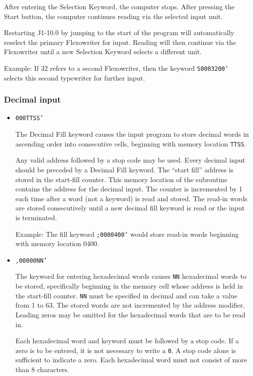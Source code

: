 \documentclass{article}
\begin{document}
\begin{enumerate}
\begin{itemize}
After entering the Selection Keyword, the computer stops. After pressing the Start button, the computer continues reading via the selected input unit. 

Restarting J1-10.0 by jumping to the start of the program will automatically reselect the primary Flexowriter for input. Reading will then continue via the Flexowriter until a new Selection Keyword selects a different unit.

Example: If 32 refers to a second Flexowriter, then the keyword \texttt{S0003200'} selects this second typewriter for further input.

\end{itemize}
\subsubsection*{Decimal input}

\begin{itemize}
\item \texttt{000TTSS'}

The Decimal Fill keyword causes the input program to store decimal words in ascending order into consecutive cells, beginning with memory location \texttt{TTSS}.

Any valid address followed by a stop code may be used. Every decimal input should be preceded by a Decimal Fill keyword. The ``start fill'' address is stored in the start-fill counter. This memory location of the subroutine contains the address for the decimal input. The counter is incremented by 1 each time after a word (not a keyword) is read and stored. The read-in words are stored consecutively until a new decimal fill keyword is read or the input is terminated.

Example: The fill keyword \texttt{;0000400'} would store read-in words beginning with memory location 0400.

\item \texttt{,00000NN'}

The keyword for entering hexadecimal words causes \texttt{NN} hexadecimal words to be stored, specifically beginning in the memory cell whose address is held in the start-fill counter. \texttt{NN} must be specified in decimal and can take a value from 1 to 63. The stored words are not incremented by the address modifier. Leading zeros may be omitted for the hexadecimal words that are to be read in.

Each hexadecimal word and keyword must be followed by a stop code. If a zero is to be entered, it is not necessary to write a \texttt{0}. A stop code alone is sufficient to indicate a zero. Each hexadecimal word must not consist of more than 8 characters.


\end{itemize}
\end{enumerate}
\end{document}

